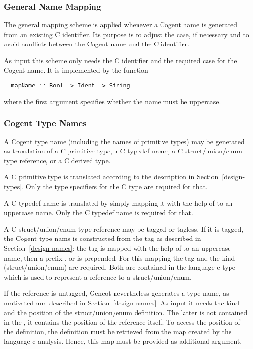 \subsubsection{General Name Mapping}

The general mapping scheme is applied whenever a Cogent name is generated from an existing C identifier.
Its purpose is to adjust the case, if necessary and to avoid conflicts between the Cogent name and
the C identifier.

As input this scheme only needs the C identifier and the required case for the Cogent name.
It is implemented by the function
\begin{verbatim}
  mapName :: Bool -> Ident -> String
\end{verbatim}
where the first argument specifies whether the name must be uppercase.

\subsubsection{Cogent Type Names}

A Cogent type name (including the names of primitive types) may be generated as translation of a C 
primitive type, a C typedef name, a C struct/union/enum type reference, or a C derived type. 

A C primitive type is translated according to the description in Section~\ref{design-types}. Only the
type specifiers for the C type are required for that.

A C typedef name is translated by simply mapping it with the help of  to an uppercase name.
Only the C typedef name is required for that.

A C struct/union/enum type reference may be tagged or tagless. If it is tagged, the Cogent type name is
constructed from the tag as described in Section~\ref{design-names}: the tag is mapped with the help of
 to an uppercase name, then a prefix ,  or  is 
prepended. For this mapping the tag and the kind (struct/union/enum) are required. Both are contained
in the language-c type  which is used to represent a reference to a struct/union/enum.

If the reference is untagged, Gencot nevertheless generates a type name, as motivated and described 
in Section~\ref{design-names}. As input it needs the kind and the position of the struct/union/enum 
definition. The latter is not contained in the , it contains the position of the reference
itself. To access the position of the definition, the definition must be retrieved from the 
 map created by the language-c analysis. Hence, this map must be provided as additional 
argument.

